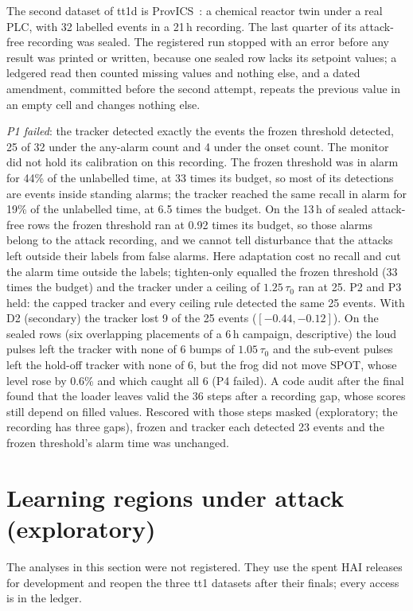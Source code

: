 \documentclass[sigconf,review,anonymous]{acmart}
\begin{document}
The second dataset of tt1d is ProvICS~\cite{shibbir2026provics}: a chemical reactor twin under a real
PLC, with 32 labelled events in a 21\,h recording. The last quarter of its attack-free recording was
sealed. The registered run stopped with an error before any result was printed or written, because one
sealed row lacks its setpoint values; a ledgered read then counted missing values and nothing else, and a dated
amendment, committed before the second attempt, repeats the previous value in an empty cell and changes
nothing else.

\emph{P1 failed}: the tracker detected exactly the events the frozen threshold detected, 25 of 32
under the any-alarm count and 4 under the onset count. The monitor did not hold its calibration on
this recording. The frozen threshold was in alarm for 44\% of the unlabelled time, at 33 times its
budget, so most of its detections are events inside standing alarms; the tracker reached the same
recall in alarm for 19\% of the unlabelled time, at 6.5 times the budget. On the 13\,h of sealed
attack-free rows the frozen threshold ran at 0.92 times its budget, so those alarms belong to the attack
recording, and we cannot tell disturbance that the attacks left outside their labels from false alarms.
Here adaptation cost no recall and cut the alarm time outside the labels; tighten-only equalled the
frozen threshold (33 times the budget) and the tracker under a ceiling of $1.25\,\tau_0$ ran at 25. P2
and P3 held: the capped tracker and every ceiling rule detected the same 25 events. With D2
(secondary) the tracker lost 9 of the 25 events ($[-0.44, -0.12]$). On
the sealed rows (six overlapping placements of a 6\,h campaign, descriptive) the loud pulses left the
tracker with none of 6 bumps of $1.05\,\tau_0$ and the sub-event pulses left the hold-off tracker with
none of 6, but the frog did not move SPOT, whose level rose by 0.6\% and which caught all 6 (P4 failed).
A code audit after the final found that the loader leaves valid the 36 steps after a recording gap,
whose scores still depend on filled values. Rescored with those steps masked (exploratory; the
recording has three gaps), frozen and tracker each detected 23 events and the frozen threshold's alarm
time was unchanged.

\section{Learning regions under attack (exploratory)}
\label{sec:regions}

The analyses in this section were not registered. They use the spent HAI releases for development
and reopen the three tt1 datasets after their finals; every access is in the ledger.
\end{document}
